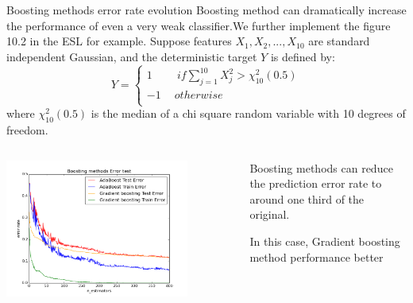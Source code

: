 \documentclass[xcolor={x11names,svgnames,dvipsnames}]{beamer}
\begin{document}
\begin{frame}
	\begin{block}{Boosting methods error rate evolution}
		\footnotesize{
      Boosting method can dramatically increase the performance of even a very weak classifier.We further implement the figure 10.2 in the ESL for example. Suppose features $X_1, X_2,...,X_10$ are standard independent Gaussian, and the deterministic target $Y$ is defined by:\\
      \begin{equation*}
       Y=\left\{
       \begin{array}{l}
       1\ \quad\quad if \sum_{j=1}^{10}X_j^2>\chi_{10}^2(0.5) \\
       -1\ \quad otherwise\\
       \end{array}
       \right.    
      \end{equation*} 
    where $\chi_{10}^2(0.5)$ is the median of a chi square random variable with 10 degrees of freedom.}
	\end{block}
	\begin{columns}		
		\begin{column}{.6\textwidth}
			\begin{center}
						\includegraphics[width=0.8\textwidth, height=0.45\textheight]{boosting_error.png}
			\end{center}
		\end{column}
		\begin{column}{.4\textwidth}
			\begin{itemize}
				\small{
			\item Boosting methods can reduce the prediction error rate to around one third of the original.
			\item In this case, Gradient boosting method performance better}
			\end{itemize}
		\end{column}
	\end{columns}	
\end{frame}
\end{document}
